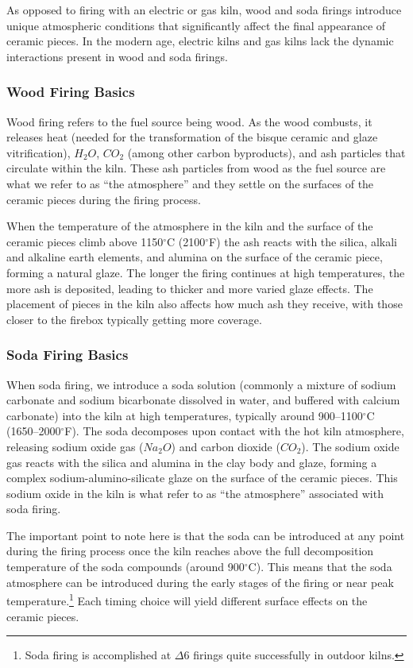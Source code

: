 \documentclass[12pt]{scrartcl}
\begin{document}
As opposed to firing with an electric or gas kiln, wood and soda firings introduce unique atmospheric conditions that significantly affect the final appearance of ceramic pieces. In the modern age, electric kilns and gas kilns lack the dynamic interactions present in wood and soda firings.
\subsubsection*{Wood Firing Basics}
Wood firing refers to the fuel source being wood. As the wood combusts, it releases heat (needed for the transformation of the bisque ceramic and glaze vitrification), $H_2O$, $CO_2$ (among other carbon byproducts), and ash particles that circulate within the kiln.  These ash particles from wood as the fuel source are what we refer to as ``the atmosphere'' and they settle on the surfaces of the ceramic pieces during the firing process.

When the temperature of the atmosphere in the kiln and the surface of the ceramic pieces climb above 1150$^\circ$C (2100$^\circ$F) the ash reacts with the silica, alkali and alkaline earth elements, and alumina on the surface of the ceramic piece, forming a natural glaze. The longer the firing continues at high temperatures, the more ash is deposited, leading to thicker and more varied glaze effects. The placement of pieces in the kiln also affects how much ash they receive, with those closer to the firebox typically getting more coverage.
\subsubsection*{Soda Firing Basics}
When soda firing, we introduce a soda solution (commonly a mixture of sodium carbonate and sodium bicarbonate dissolved in water, and buffered with calcium carbonate) into the kiln at high temperatures, typically around 900--1100$^\circ$C (1650--2000$^\circ$F). The soda decomposes upon contact with the hot kiln atmosphere, releasing sodium oxide gas ($Na_2O$) and carbon dioxide ($CO_2$). The sodium oxide gas reacts with the silica and alumina in the clay body and glaze, forming a complex sodium-alumino-silicate glaze on the surface of the ceramic pieces. This sodium oxide in the kiln is what refer to as ``the atmosphere'' associated with soda firing.  

The important point to note here is that the soda can be introduced at any point during the firing process once the kiln reaches above the full decomposition temperature of the soda compounds (around 900$^\circ$C).  This means that the soda atmosphere can be introduced during the early stages of the firing or near peak temperature.\footnote{Soda firing is accomplished at $\Delta6$ firings quite successfully in outdoor kilns.}  Each timing choice will yield different surface effects on the ceramic pieces.
\end{document}
